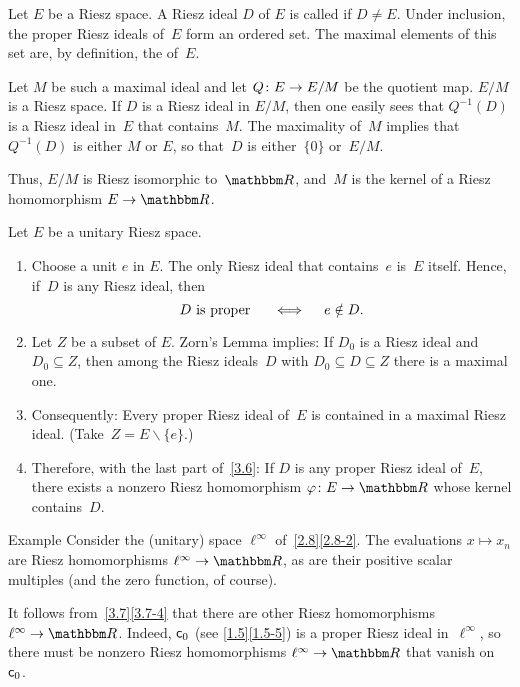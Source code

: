 \documentclass[main.tex]{subfiles}
\begin{document}
\begin{psec}{3.6}%
Let $E$ be a Riesz space.
A Riesz ideal $D$ of $E$ is called 
if $D\neq E$.
Under inclusion,
the proper Riesz ideals of~$E$
form an ordered set.
The maximal elements of this set are,
by definition,
the  of~$E$.

Let $M$ be such a maximal ideal and 
let $Q\colon E\rightarrow E/M$ be the quotient map.
$E/M$ is a Riesz space.
If $D$ is a Riesz ideal in $E/M$,
then one easily sees 
that $Q^{-1}(D)$ is a Riesz ideal in~$E$
that contains~$M$.
The maximality of~$M$ 
implies that~$Q^{-1}(D)$ is either $M$ or $E$,
so that~$D$ is either~$\{ 0\}$ or~$E/M$.

Thus, $E/M$ is Riesz isomorphic to~$\R$,
and~$M$ is the kernel of a Riesz homomorphism
$E\ra \R$.
\end{psec}
%
%
\begin{psec}{3.7}%
Let $E$ be a unitary Riesz space.
\begin{enumerate}
\item \label{3.7-1}
Choose a unit $e$ in $E$. 
The only Riesz ideal that contains~$e$ is~$E$ itself.
Hence, if~$D$ is any Riesz ideal, then
\begin{equation*}
D\text{ is proper }\quad \iff \quad e\notin D\text{.}
\end{equation*}
%
\item \label{3.7-2}
Let $Z$ be a subset of $E$.
Zorn's Lemma implies:
If $D_0$ is a Riesz ideal
and~$D_0\subseteq Z$,
then among the Riesz ideals~$D$ 
with $D_0\subseteq D\subseteq Z$
there is a maximal one.
%
\item \label{3.7-3}
Consequently:
Every proper Riesz ideal of~$E$
is contained in a maximal Riesz ideal.
(Take~$Z=E\backslash\{ e \}$.)
%
\item \label{3.7-4}
Therefore,
with the last part of~\ref{3.6}:
If $D$ is any proper Riesz ideal of~$E$,
there exists a nonzero Riesz homomorphism
$\varphi\colon E\ra\R$ whose kernel contains~$D$.
\end{enumerate}
\end{psec}
%
%
\begin{psec}{3.8}{Example}
Consider the (unitary) space $\ell^\infty$
of~\ref{2.8}\ref{2.8-2}.
The evaluations $x\mapsto x_n$ 
are Riesz homomorphisms $\ell^\infty\ra \R$,
as are their positive scalar multiples
(and the zero function, of course).

It follows from~\ref{3.7}\ref{3.7-4}
that there are other Riesz homomorphisms
$\ell^\infty \ra \R$.
Indeed,
$\mathsf{c}_0$ (see \ref{1.5}\ref{1.5-5}) 
is a proper Riesz ideal in~$\ell^\infty$,
so there must be nonzero Riesz homomorphisms
$\ell^\infty\ra \R$ that vanish on~$\mathsf{c}_0$.
\end{psec}
\end{document}
